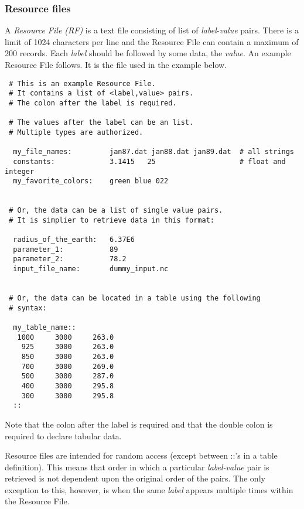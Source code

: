 
 \subsubsection{Resource files}

   A {\em Resource File (RF)} is a text file consisting of list of 
   {\em label}-{\em value} pairs. There is a limit of 1024 characters 
   per line and the Resource File can contain a maximum of 200 records. 
   Each {\em label} should be followed by some data, the {\em value}. 
   An example Resource File follows.  It is the file used in the example 
   below. 

 \begin{verbatim}
 # This is an example Resource File.  
 # It contains a list of <label,value> pairs.
 # The colon after the label is required. 

 # The values after the label can be an list.
 # Multiple types are authorized.
  
  my_file_names:         jan87.dat jan88.dat jan89.dat  # all strings
  constants:             3.1415   25                    # float and integer
  my_favorite_colors:    green blue 022               


 # Or, the data can be a list of single value pairs. 
 # It is simplier to retrieve data in this format:

  radius_of_the_earth:   6.37E6         
  parameter_1:           89
  parameter_2:           78.2
  input_file_name:       dummy_input.nc


 # Or, the data can be located in a table using the following
 # syntax:

  my_table_name::
   1000     3000     263.0
    925     3000     263.0
    850     3000     263.0
    700     3000     269.0
    500     3000     287.0
    400     3000     295.8
    300     3000     295.8
  ::
 \end{verbatim}

 Note that the colon after the label is required and that the double colon is required
 to declare tabular data. 

 Resource files are intended for random access (except between ::'s in a 
 table definition). This means that order in which a particular 
 {\em label-value} pair is retrieved is not dependent upon the original order 
 of the pairs. The only exception to this, however, is when the same {\em label} appears 
 multiple times within the Resource File.





